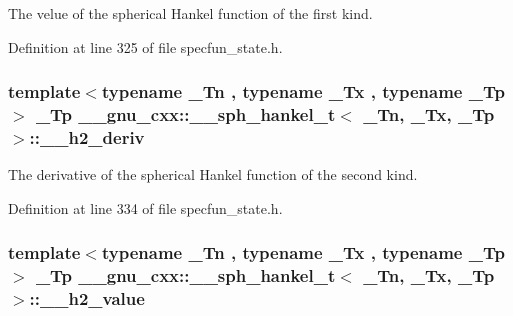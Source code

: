 The velue of the spherical Hankel function of the first kind. 



Definition at line 325 of file specfun\+\_\+state.\+h.

\subsubsection[{\texorpdfstring{\+\_\+\+\_\+h2\+\_\+deriv}{__h2_deriv}}]{\setlength{\rightskip}{0pt plus 5cm}template$<$typename \+\_\+\+Tn , typename \+\_\+\+Tx , typename \+\_\+\+Tp $>$ \+\_\+\+Tp {\bf \+\_\+\+\_\+gnu\+\_\+cxx\+::\+\_\+\+\_\+sph\+\_\+hankel\+\_\+t}$<$ \+\_\+\+Tn, \+\_\+\+Tx, \+\_\+\+Tp $>$\+::\+\_\+\+\_\+h2\+\_\+deriv}\hypertarget{struct____gnu__cxx_1_1____sph__hankel__t_a7b6cbd23f269cf3b0c76d1fc21bede4d}{}\label{struct____gnu__cxx_1_1____sph__hankel__t_a7b6cbd23f269cf3b0c76d1fc21bede4d}


The derivative of the spherical Hankel function of the second kind. 



Definition at line 334 of file specfun\+\_\+state.\+h.

\subsubsection[{\texorpdfstring{\+\_\+\+\_\+h2\+\_\+value}{__h2_value}}]{\setlength{\rightskip}{0pt plus 5cm}template$<$typename \+\_\+\+Tn , typename \+\_\+\+Tx , typename \+\_\+\+Tp $>$ \+\_\+\+Tp {\bf \+\_\+\+\_\+gnu\+\_\+cxx\+::\+\_\+\+\_\+sph\+\_\+hankel\+\_\+t}$<$ \+\_\+\+Tn, \+\_\+\+Tx, \+\_\+\+Tp $>$\+::\+\_\+\+\_\+h2\+\_\+value}\hypertarget{struct____gnu__cxx_1_1____sph__hankel__t_a225e48ba2faafbdabd65cd173372d418}{}\label{struct____gnu__cxx_1_1____sph__hankel__t_a225e48ba2faafbdabd65cd173372d418}


